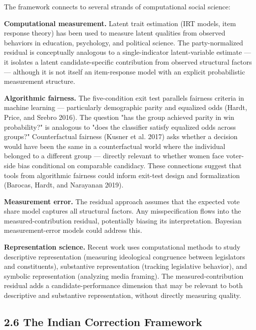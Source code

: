 \documentclass[
]{article}
\begin{document}
The framework connects to several strands of computational social science:

\textbf{Computational measurement.} Latent trait estimation (IRT models, item response theory) has been used to measure latent qualities from observed behaviors in education, psychology, and political science. The party-normalized residual is conceptually analogous to a single-indicator latent-variable estimate --- it isolates a latent candidate-specific contribution from observed structural factors --- although it is not itself an item-response model with an explicit probabilistic measurement structure.

\textbf{Algorithmic fairness.} The five-condition exit test parallels fairness criteria in machine learning --- particularly demographic parity and equalized odds (Hardt, Price, and Srebro 2016). The question "has the group achieved parity in win probability?" is analogous to "does the classifier satisfy equalized odds across groups?" Counterfactual fairness (Kusner et al. 2017) asks whether a decision would have been the same in a counterfactual world where the individual belonged to a different group --- directly relevant to whether women face voter-side bias conditional on comparable candidacy. These connections suggest that tools from algorithmic fairness could inform exit-test design and formalization (Barocas, Hardt, and Narayanan 2019).

\textbf{Measurement error.} The residual approach assumes that the expected vote share model captures all structural factors. Any misspecification flows into the measured-contribution residual, potentially biasing its interpretation. Bayesian measurement-error models could address this.

\textbf{Representation science.} Recent work uses computational methods to study descriptive representation (measuring ideological congruence between legislators and constituents), substantive representation (tracking legislative behavior), and symbolic representation (analyzing media framing). The measured-contribution residual adds a candidate-performance dimension that may be relevant to both descriptive and substantive representation, without directly measuring quality.

\subsection{2.6 The Indian Correction Framework}\label{26-the-indian-correction-framework}
\end{document}
